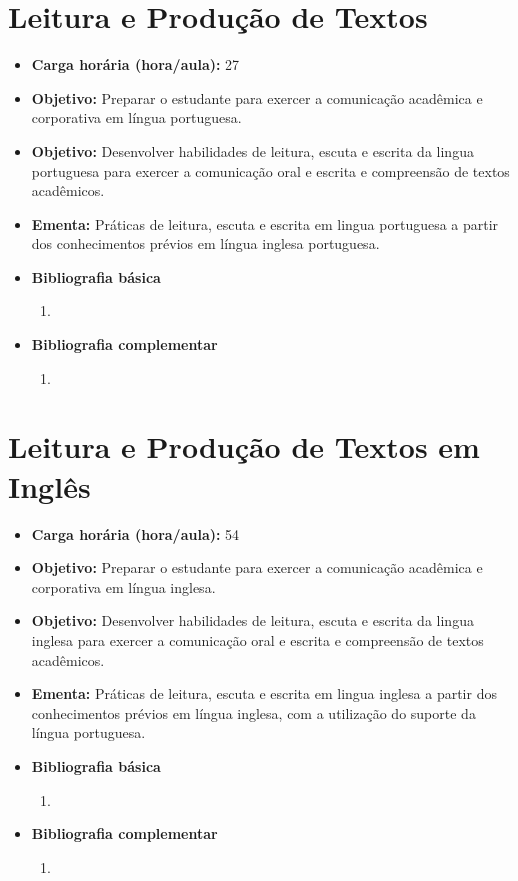 \documentclass[
	10pt,				%
	openright,			%
	twoside,			%
	a4paper,			%
	english,			%
	french,				%
	brazil,				%
	sumario=tradicional
]{abntex2}
\begin{document}
\section*{Leitura e Produção de Textos}\label{1_leitprodtextos}
\begin{itemize}
	\item \textbf{Carga horária (hora/aula):} 27
	\item \textbf{Objetivo:} Preparar o estudante para exercer a comunicação acadêmica e corporativa em língua portuguesa.
	\item \textbf{Objetivo:} Desenvolver habilidades de leitura, escuta e escrita da lingua portuguesa para exercer a comunicação oral e escrita e compreensão de textos acadêmicos.
	\item \textbf{Ementa:} 
	Práticas de leitura, escuta e escrita em lingua portuguesa a partir dos conhecimentos prévios em língua inglesa	portuguesa.
	\item \textbf{Bibliografia básica}
	\begin{enumerate}
		\item 
	\end{enumerate}
	\item \textbf{Bibliografia complementar}
	\begin{enumerate}
		\item 
	\end{enumerate}	
\end{itemize}

\newpage
\section*{Leitura e Produção de Textos em Inglês}\label{1_inglacad}
\begin{itemize}
	\item \textbf{Carga horária (hora/aula):} 54
	\item \textbf{Objetivo:} Preparar o estudante para exercer a comunicação acadêmica e corporativa em língua inglesa.
	\item \textbf{Objetivo:} Desenvolver habilidades de leitura, escuta e escrita da lingua inglesa para exercer a comunicação oral e escrita e compreensão de textos acadêmicos.
	\item \textbf{Ementa:} 
	Práticas de leitura, escuta e escrita em lingua inglesa a partir dos conhecimentos prévios em língua inglesa, com a utilização do suporte da língua portuguesa.
	\item \textbf{Bibliografia básica}
	\begin{enumerate}
		\item 
	\end{enumerate}
	\item \textbf{Bibliografia complementar}
	\begin{enumerate}
		\item 
	\end{enumerate}	
\end{itemize}
\end{document}
